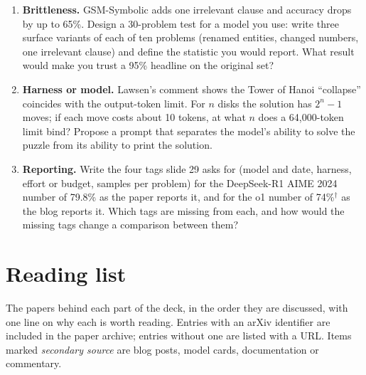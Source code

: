 \documentclass[11pt,letterpaper]{article}
\begin{document}
\begin{enumerate}[leftmargin=1.6em,itemsep=6pt]
\item \textbf{Brittleness.} GSM-Symbolic adds one irrelevant clause and accuracy drops by up to 65\%. Design a 30-problem test for a model you use: write three surface variants of each of ten problems (renamed entities, changed numbers, one irrelevant clause) and define the statistic you would report. What result would make you trust a 95\% headline on the original set?
\item \textbf{Harness or model.} Lawsen's comment shows the Tower of Hanoi ``collapse'' coincides with the output-token limit. For $n$ disks the solution has $2^n-1$ moves; if each move costs about 10 tokens, at what $n$ does a 64{,}000-token limit bind? Propose a prompt that separates the model's ability to solve the puzzle from its ability to print the solution.
\item \textbf{Reporting.} Write the four tags slide 29 asks for (model and date, harness, effort or budget, samples per problem) for the DeepSeek-R1 AIME 2024 number of 79.8\% as the paper reports it, and for the o1 number of 74\%$^\dagger$ as the blog reports it. Which tags are missing from each, and how would the missing tags change a comparison between them?
\end{enumerate}
\clearpage
\section{Reading list}
\label{app:reading}
The papers behind each part of the deck, in the order they are discussed, with one line on why each is worth reading. Entries with an arXiv identifier are included in the paper archive; entries without one are listed with a URL. Items marked \emph{secondary source} are blog posts, model cards, documentation or commentary.
\end{document}
